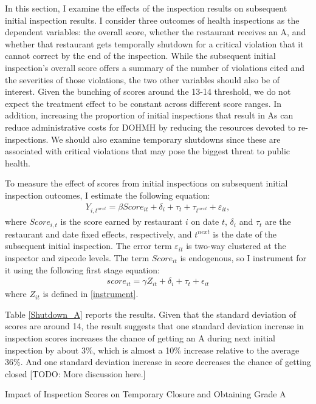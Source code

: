 \documentclass[10pt]{article} %
\begin{document}
In this section, I examine the effects of the inspection results on subsequent initial inspection results. I consider three outcomes of health inspections as the dependent variables: the overall score, whether the restaurant receives an A, and whether that restaurant gets temporally shutdown for a critical violation that it cannot correct by the end of the inspection. While the subsequent initial inspection's overall score offers a summary of the number of violations cited and the severities of those violations, the two other variables should also be of interest. Given the bunching of scores around the 13-14 threshold, we do not expect the treatment effect to be constant across different score ranges. In addition, increasing the proportion of initial inspections that result in As can reduce administrative costs for DOHMH by reducing the resources devoted to re-inspections. We should also examine temporary shutdowns since these are associated with critical violations that may pose the biggest threat to public health. 

To measure the effect of scores from initial inspections on subsequent initial inspection outcomes, I estimate the following equation: 
\begin{align}
        Y_{i,t^{next}} = \beta Score_{it} + \delta_i + \tau_{t} + \tau_{t^{next}} + \varepsilon_{it},
        \label{score}
\end{align}
where $Score_{i,t}$ is the score earned by restaurant $i$ on date $t$, $\delta_i$ and $\tau_t$ are the restaurant and date fixed effects, respectively, and $t^{next}$ is the date of the subsequent initial inspection. The error term $\varepsilon_{it}$ is two-way clustered at the inspector and zipcode levels. The term $Score_{it}$ is endogenous, so I instrument for it using the following first stage equation:
\begin{align}
score_{it} = \gamma Z_{it} + \delta_i + \tau_t + \epsilon_{it}
\label{first_stage_eq}
\end{align}
where $Z_{it}$ is defined in \eqref{instrument}.

Table \ref{Shutdown_A} reports the results. Given that the standard deviation of scores are around 14, the result suggests that one standard deviation increase in inspection scores increases the chance of getting an A during next initial inspection by about 3\%, which is almost a 10\% increase relative to the average 36\%. And one standard deviation increase in score decreases the chance of getting closed [TODO: More discussion here.]
\begin{table}
\centering
\scalebox{0.7}{}
\caption{Impact of Inspection Scores on Temporary Closure and Obtaining Grade A}
\label{Shutdown_A}
\end{table}
\end{document}
